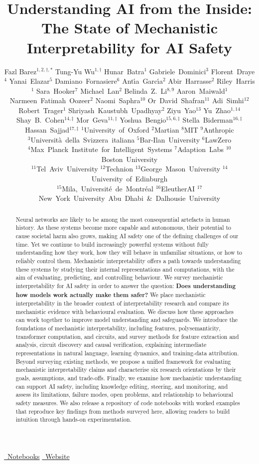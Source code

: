 \documentclass[10pt]{article} %
\title{Understanding AI from the Inside: \\
The State of Mechanistic Interpretability for AI Safety}
\author{%
\begin{minipage}{\textwidth}
\centering
{\normalsize\normalfont\color{black}
Fazl Barez$^{1,2,\dagger,*}$ \qquad Tung-Yu Wu$^{1,\dagger}$\endgraf
}
\vspace{6pt}
{\normalsize\normalfont\color{black}
\mbox{Hunar Batra$^{1}$} \quad \mbox{Gabriele Dominici$^{3}$} \quad \mbox{Florent Draye$^{4}$} \quad \mbox{Yanai Elazar$^{5}$} \quad \mbox{Damiano Fornasiere$^{6}$} \quad \mbox{Ant\'{\i}a Garc\'{\i}a$^{2}$} \quad \mbox{Abir Harrasse$^{2}$} \quad \mbox{Riley Harris$^{1}$} \quad \mbox{Sara Hooker$^{7}$} \quad \mbox{Michael Lan$^{2}$} \quad \mbox{Belinda Z. Li$^{8,9}$} \quad \mbox{Aaron Maiwald$^{1}$} \quad \mbox{Narmeen Fatimah Oozeer$^{2}$} \quad \mbox{Naomi Saphra$^{10}$} \quad \mbox{Or David Shafran$^{11}$} \quad \mbox{Adi Simhi$^{12}$} \quad \mbox{Robert Trager$^{1}$} \quad \mbox{Shriyash Kaustubh Upadhyay$^{2}$} \quad \mbox{Ziyu Yao$^{13}$} \quad \mbox{Yu Zhao$^{1,14}$}\endgraf
}
\vspace{6pt}
{\normalsize\normalfont\color{black}
\mbox{Shay B. Cohen$^{14,\ddagger}$} \quad \mbox{Mor Geva$^{11,\ddagger}$} \quad \mbox{Yoshua Bengio$^{15,6,\ddagger}$} \quad \mbox{Stella Biderman$^{16,\ddagger}$} \quad \mbox{Hassan Sajjad$^{17,\ddagger}$}\endgraf
}
\vspace{12pt}
{\small\normalfont\color[HTML]{002147}
\mbox{$^{1}$University of Oxford} \quad \mbox{$^{2}$Martian} \quad \mbox{$^{8}$MIT} \quad \mbox{$^{9}$Anthropic}\\
\mbox{$^{3}$Universit\`a della Svizzera italiana} \quad \mbox{$^{5}$Bar-Ilan University} \quad \mbox{$^{6}$LawZero}\\
\mbox{$^{4}$Max Planck Institute for Intelligent Systems} \quad \mbox{$^{7}$Adaption Labs} \quad \mbox{$^{10}$Boston University}\\
\mbox{$^{11}$Tel Aviv University} \quad \mbox{$^{12}$Technion} \quad \mbox{$^{13}$George Mason University} \quad \mbox{$^{14}$University of Edinburgh}\\
\mbox{$^{15}$Mila, Universit\'e de Montr\'eal} \quad \mbox{$^{16}$EleutherAI} \quad \mbox{$^{17}$New York University Abu Dhabi \& Dalhousie University}\endgraf
}
\end{minipage}%
}
\begin{document}
\maketitle

\begin{abstract}

Neural networks are likely to be among the most consequential artefacts in human history. As these systems become more capable and autonomous, their potential to cause societal harm also grows, making AI safety one of the defining challenges of our time. Yet we continue to build increasingly powerful systems without fully understanding how they work, how they will behave in unfamiliar situations, or how to reliably control them. Mechanistic interpretability offers a path towards understanding these systems by studying their internal representations and computations, with the aim of evaluating, predicting, and controlling behaviour. We survey mechanistic interpretability for AI safety in order to answer the question: \textbf{Does understanding how models work actually make them safer?} We place mechanistic interpretability in the broader context of interpretability research and compare its mechanistic evidence with behavioural evaluation. We discuss how these approaches can work together to improve model understanding and safeguards. We introduce the foundations of mechanistic interpretability, including features, polysemanticity, transformer computation, and circuits, and survey methods for feature extraction and analysis, circuit discovery and causal verification, explaining intermediate representations in natural language, learning dynamics, and training-data attribution. Beyond surveying existing methods, we propose a unified framework for evaluating mechanistic interpretability claims and characterise six research orientations by their goals, assumptions, and trade-offs. Finally, we examine how mechanistic understanding can support AI safety, including knowledge editing, steering, and monitoring, and assess its limitations, failure modes, open problems, and relationship to behavioural safety measures. We also release a repository of code notebooks with worked examples that reproduce key findings from methods surveyed here, allowing readers to build intuition through hands-on experimentation.

\end{abstract}

{\centering\small
\href{https://github.com/TSGLAB/Interpretability_Survey_Safety}{\textcolor{oxfordblue}{\faGithub\ Notebooks}}%
\hspace{2em}%
\href{https://tsglab.github.io/mi_survey/}{\textcolor{oxfordblue}{\faGlobe\ Website}}%
\par}
\newpage
\end{document}
